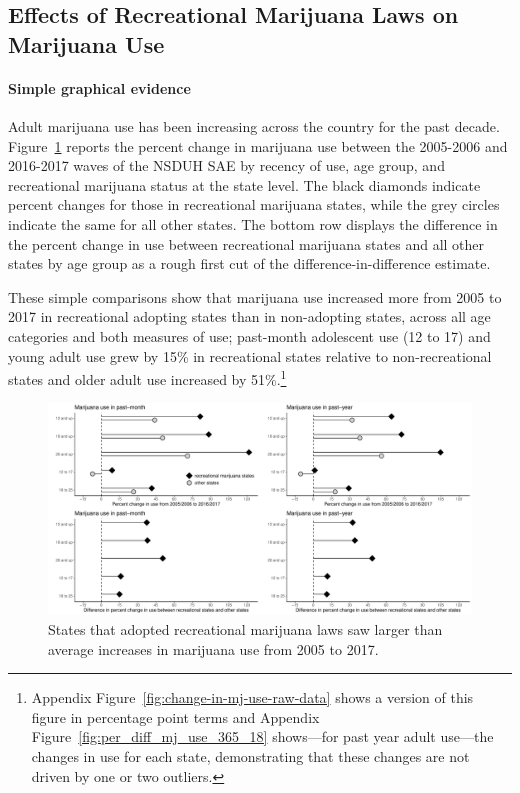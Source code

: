 \documentclass[12pt]{article}%
\begin{document}
\subsection{Effects of Recreational Marijuana Laws on Marijuana Use}
\label{sec:results_recreational}

\paragraph{Simple graphical evidence}
Adult marijuana use has been increasing across the country for the past decade. 
Figure~\ref{fig:change-in-mj-use-percent} reports the percent change in marijuana use between the 2005-2006 and 2016-2017 waves of the NSDUH SAE by recency of use, age group, and recreational marijuana status at the state level. 
The black diamonds indicate percent changes for those in recreational marijuana states, while the grey circles indicate the same for all other states. 
The bottom row displays the difference in the percent change in use between recreational marijuana states and all other states by age group as a rough first cut of the difference-in-difference estimate. 

These simple comparisons show that marijuana use increased more from 2005 to 2017 in recreational adopting states than in non-adopting states, across all age categories and both measures of use; past-month adolescent use (12 to 17) and young adult use grew by 15\% in recreational states relative to non-recreational states and older adult use increased by 51\%.\footnote{{ Appendix Figure~\ref{fig:change-in-mj-use-raw-data} shows a version of this figure in percentage point terms and Appendix Figure~\ref{fig:per_diff_mj_use_365_18} shows---for past year adult use---the changes in use for each state, demonstrating that these changes are not driven by one or two outliers.}}

\begin{figure}[H]
    \caption{States that adopted recreational marijuana laws saw larger than average increases in marijuana use from 2005 to 2017.}
    \begin{minipage}{\linewidth}
        \includegraphics[width=\linewidth]{../output/plots/bw-change-in-use.pdf}
    \end{minipage}
        \label{fig:change-in-mj-use-percent}
\end{figure}
\end{document}
